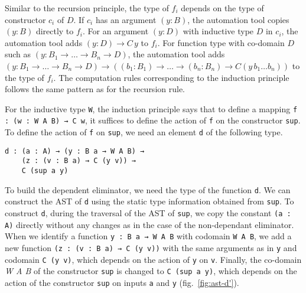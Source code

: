 \documentclass[sigplan,10pt]{acmart}
\begin{document}
Similar to the recursion principle, the type of $f_i$ depends on the type of constructor $c_i$ of $D$. If $c_i$ has an argument $(y : B)$, the automation tool copies $(y : B)$ directly to $f_i$. For an argument $(y : D)$ with inductive type $D$ in $c_i$, the automation tool adds $(y : D) \to C \, y$ to $f_i$. For function type with co-domain $D$ such as $(y : B_1 \to\ldots\to B_n \to D)$, the automation tool adds $(y : B_1 \to \ldots \to B_n \to D) \to ((b_1 : B_1) \to \ldots \to (b_n : B_n) \to C (y \, b_1 \ldots b_n))$ to the type of $f_i$. The computation rules corresponding to the induction principle follows the same pattern as for the recursion rule.

For the inductive type {\tt W}, the induction principle says that to define a mapping {\tt f : (w : W A B) → C w}, it suffices to define the action of {\tt f} on the constructor {\tt sup}. To define the action of {\tt f} on {\tt sup}, we need an element {\tt d} of the following type.

\begin{center}
\begingroup
\begin{BVerbatim}
d : (a : A) → (y : B a → W A B) → 
    (z : (v : B a) → C (y v)) → 
    C (sup a y)
\end{BVerbatim}
\endgroup
\end{center}

To build the dependent eliminator, we need the type of the function {\tt d}. We can construct the AST of {\tt d} using the static type information obtained from {\tt sup}. To construct {\tt d}, during the traversal of the AST of {\tt sup}, we copy the constant {\tt (a : A)} directly without any changes as in the case of the non-dependant eliminator. When we identify a function {\tt y : B a → W A B} with codomain {\tt W A B}, we add a new function {\tt (z : (v : B a) → C (y v))} with the same arguments as in {\tt y} and codomain {\tt C (y v)}, which depends on the action of {\tt y} on {\tt v}. Finally, the co-domain \emph{W A B} of the constructor {\tt sup} is changed to {\tt C (sup a y)}, which depends on the action of the constructor {\tt sup} on inputs {\tt a} and {\tt y} (fig.~\ref{fig:ast-d'}).
\end{document}
